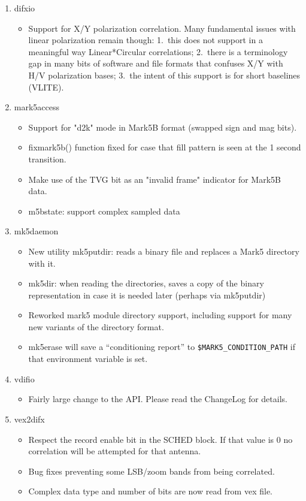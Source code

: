 \begin{enumerate}
\item difxio
\begin{itemize}
\item Support for X/Y polarization correlation.  Many fundamental issues with       
  linear polarization remain though: 
1.\ this does not support in a meaningful way Linear*Circular correlations;
2.\ there is a terminology gap in many bits of software and file formats that confuses X/Y with H/V polarization bases;
3.\ the intent of this support is for short baselines (VLITE).
\end{itemize}

\item mark5access
\begin{itemize}
\item Support for "d2k" mode in Mark5B format (swapped sign and mag bits).
\item fixmark5b() function fixed for case that fill pattern is seen at the 1 second transition.
\item Make use of the TVG bit as an "invalid frame" indicator for Mark5B data.
\item m5bstate: support complex sampled data
\end{itemize}

\item mk5daemon
\begin{itemize}
\item New utility mk5putdir: reads a binary file and replaces a Mark5 directory with it.
\item mk5dir: when reading the directories, saves a copy of the binary representation in case it is needed later (perhaps via mk5putdir)
\item Reworked mark5 module directory support, including support for many new variants of the directory format.
\item mk5erase will save a ``conditioning report'' to {\tt \$MARK5\_CONDITION\_PATH} if that environment variable is set.
\end{itemize}

\item vdifio
\begin{itemize}
\item Fairly large change to the API.  Please read the ChangeLog for details.
\end{itemize}

\item vex2difx
\begin{itemize}
\item Respect the record enable bit in the SCHED block.  If that value is 0 no correlation will be attempted for that antenna.
\item Bug fixes preventing some LSB/zoom bands from being correlated.
\item Complex data type and number of bits are now read from vex file.
\end{itemize}

\end{enumerate}

